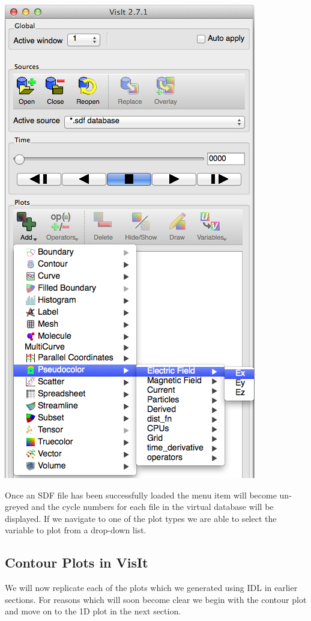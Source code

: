   \begin{center}
    \includegraphics[height=0.7\textheight]{images/visit_select_var}
  \end{center}
  Once an SDF file has been successfully loaded the  menu item
  will become un-greyed and the cycle numbers for each file in the virtual
  database will be displayed. If we navigate to one of the plot types we
  are able to select the variable to plot from a drop-down list.

\subsection{Contour Plots in VisIt}
  We will now replicate each of the plots which we generated using IDL
  in earlier sections. For reasons which will soon become clear we begin
  with the contour plot and move on to the 1D plot in the next section.

